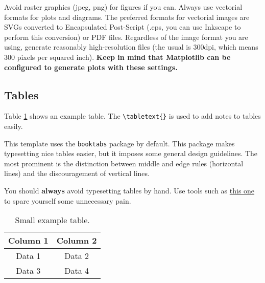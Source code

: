 \documentclass[9pt,a4paper,twoside]{tau-class/tau}
\begin{document}
    \begin{info}
    	Avoid raster graphics (jpeg, png) for figures if you can. Always use vectorial formats for plots and diagrams. The preferred formats for vectorial images are SVGs converted to Encapsulated Post-Script (.eps, you can use Inkscape to perform this conversion) or PDF files. Regardless of the image format you are using, generate reasonably high-resolution files (the usual is 300dpi, which means 300 pixels per squared inch). \textbf{Keep in mind that Matplotlib can be configured to generate plots with these settings.}
    \end{info}

    \subsection{Tables}
	
        Table \ref{tab:table} shows an example table. The \verb|\tabletext{}| is used to add notes to tables easily. 

        \begin{info}
        	This template uses the \texttt{booktabs} package by default. This package makes typesetting nice tables easier, but it imposes some general design guidelines. The most prominent is the distinction between middle and edge rules (horizontal lines) and the discouragement of vertical lines.
        \end{info}

        \begin{info}
        	You should \textbf{always} avoid typesetting tables by hand. Use tools such as \href{https://www.tablesgenerator.com/}{this one} to spare yourself some unnecessary pain.
        \end{info}
		
	\begin{table}[H]
		\centering
		\caption{Small example table.}
		\label{tab:table}
		\begin{tabular}{cc}
			\toprule
			\textbf{Column 1} & \textbf{Column 2} \\
			\midrule
			Data 1 & Data 2 \\
			Data 3 & Data 4 \\
			\bottomrule
		\end{tabular}
			
			
	\end{table}
		
\end{document}
